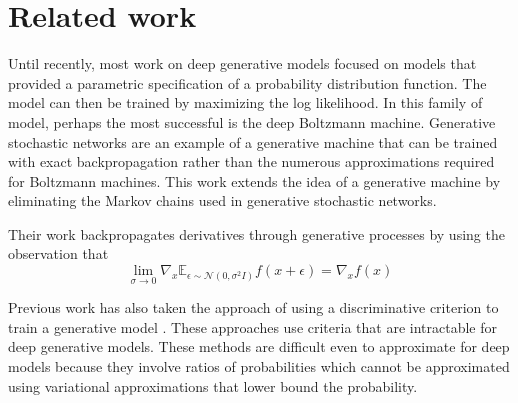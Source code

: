 \documentclass[10pt,twocolumn,letterpaper]{article}
\begin{document}
\section{Related work}
Until recently, most work on deep generative models focused on models that provided a parametric
specification of a probability distribution function. The model can then be trained by maximizing the log likelihood. In this family of model, perhaps the most successful is the deep Boltzmann machine. Generative stochastic networks \cite{bengio2014deep} are an example of
a generative machine that can be trained with exact backpropagation rather than the numerous approximations required for Boltzmann machines. This work extends the idea of a generative machine
by eliminating the Markov chains used in generative stochastic networks. 
\par
Their work backpropagates derivatives through generative processes by using the observation that
\begin{equation}
\lim_{\sigma \to 0} \nabla_x \mathbb{E}_{\epsilon \sim \mathcal{N}\left ( 0,\sigma^2 I \right)} f\left(x+\epsilon \right ) = \nabla_xf\left(x \right )
	\label{eq1}
\end{equation}
\par
Previous work has also taken the approach of using a discriminative criterion to train a generative
model \cite{tu2007learning}. These approaches use criteria that are intractable for deep generative models. These
methods are difficult even to approximate for deep models because they involve ratios of probabilities which cannot be approximated using variational approximations that lower bound the probability.

{\small
	
	
}
\end{document}
